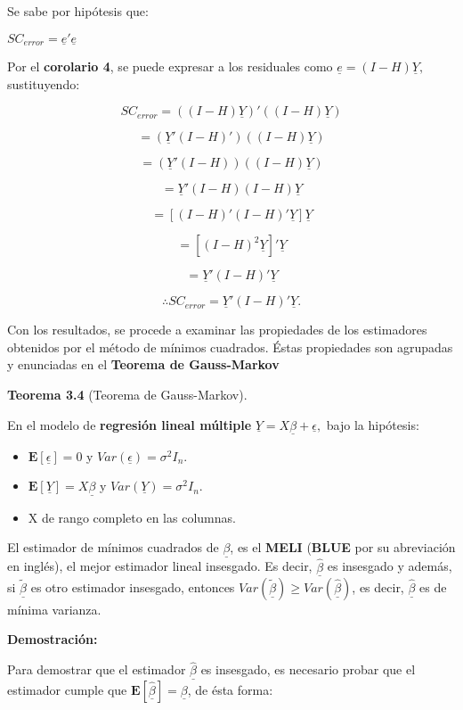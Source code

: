 \documentclass[
  a4paper,
  oneside,
  openany]{book}
\begin{document}
Se sabe por hipótesis que:

\(SC_{error}=\underline{e}'\underline{e}\)

Por el \textbf{corolario 4}, se puede expresar a los residuales como \(\underline{e}=(I-H)\underline{Y},\) sustituyendo:

\[SC_{error}=((I-H)\underline{Y})'((I-H)\underline{Y})\]

\[=(\underline{Y}'(I-H)')((I-H)\underline{Y})\]

\[=(\underline{Y}'(I-H))((I-H)\underline{Y})\]

\[=\underline{Y}'(I-H)(I-H)\underline{Y}\]

\[=[(I-H)'(I-H)'\underline{Y}]\underline{Y}\]

\[=[(I-H)^2\underline{Y}]'\underline{Y}\]

\[=\underline{Y}'(I-H)'\underline{Y}\]

\[\therefore SC_{error}=\underline{Y}'(I-H)'\underline{Y}.\]

Con los resultados, se procede a examinar las propiedades de los estimadores obtenidos por el método de mínimos cuadrados.
Éstas propiedades son agrupadas y enunciadas en el \textbf{Teorema de Gauss-Markov}

\textbf{Teorema 3.4} (Teorema de Gauss-Markov).

En el modelo de \textbf{regresión lineal múltiple} \(\underline{Y}=X \underline{\beta}+ \underline{\epsilon},\) bajo la hipótesis:

\begin{itemize}
\item
  \(\mathbf{E}[\underline{\epsilon}]=0\) y \(Var(\underline{\epsilon})=\sigma^2I_{n}.\)
\item
  \(\mathbf{E}[\underline{Y}]=X \underline{\beta}\) y \(Var(\underline{Y})=\sigma^2I_{n}.\)
\item
  X de rango completo en las columnas.
\end{itemize}

El estimador de mínimos cuadrados de \(\underline{\beta}\), es el \textbf{MELI} (\textbf{BLUE} por su abreviación en inglés), el mejor estimador lineal insesgado. Es decir, \(\underline{\hat{\beta}}\) es insesgado y además, si \(\underline{\tilde{\beta}}\) es otro estimador insesgado, entonces \(Var(\underline{\tilde{\beta}})\geq Var(\underline{\hat{\beta}})\), es decir, \(\underline{\hat{\beta}}\) es de mínima varianza.

\textbf{Demostración:}

Para demostrar que el estimador \(\underline{\hat{\beta}}\) es insesgado, es necesario probar que el estimador cumple que \(\mathbf{E}[\underline{\hat{\beta}}]=\underline{\beta}\), de ésta forma:
\end{document}
